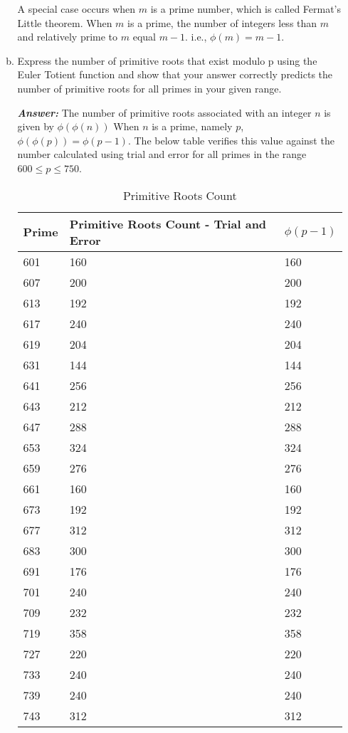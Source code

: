 \documentclass[11pt,a4paper,fleqn]{article}
\begin{document}
\begin{enumerate}[1.]
\begin{enumerate}[a.]
\begin{flushleft}
				A special case occurs when $m$ is a prime number, which is called Fermat's Little theorem. When $m$ is a prime, the number of integers less than $m$ and relatively prime to $m$ equal $m-1$. i.e., $\phi(m) = m - 1$.  
			\end{flushleft}
			\item Express the number of primitive roots that exist modulo p using the Euler Totient function and show that your answer correctly predicts the number of primitive roots for all primes in your given range.
			\begin{flushleft}
				\textbf{\textit{Answer:}} The number of primitive roots associated with an integer $n$ is given by $\phi(\phi(n))$
				When $n$ is a prime, namely $p$, $\phi(\phi(p)) = \phi(p-1)$. The below table verifies this value against the number calculated using trial and error for all primes in the range $600 \le p \le 750$.
				
				\begin{table}[!ht]
					\centering
					\begin{tabular}{|l|l|l|}
						\hline
						Prime & Primitive Roots Count - Trial and Error & $\phi(p-1)$ \\ \hline
						601 & 160 & 160 \\ \hline
						607 & 200 & 200 \\ \hline
						613 & 192 & 192 \\ \hline
						617 & 240 & 240 \\ \hline
						619 & 204 & 204 \\ \hline
						631 & 144 & 144 \\ \hline
						641 & 256 & 256 \\ \hline
						643 & 212 & 212 \\ \hline
						647 & 288 & 288 \\ \hline
						653 & 324 & 324 \\ \hline
						659 & 276 & 276 \\ \hline
						661 & 160 & 160 \\ \hline
						673 & 192 & 192 \\ \hline
						677 & 312 & 312 \\ \hline
						683 & 300 & 300 \\ \hline
						691 & 176 & 176 \\ \hline
						701 & 240 & 240 \\ \hline
						709 & 232 & 232 \\ \hline
						719 & 358 & 358 \\ \hline
						727 & 220 & 220 \\ \hline
						733 & 240 & 240 \\ \hline
						739 & 240 & 240 \\ \hline
						743 & 312 & 312 \\ \hline
					\end{tabular}
					\caption{Primitive Roots Count}
					\label{table:primitive_roots_count}
				\end{table}
				

\end{flushleft}
\end{enumerate}
\end{enumerate}
\end{document}
